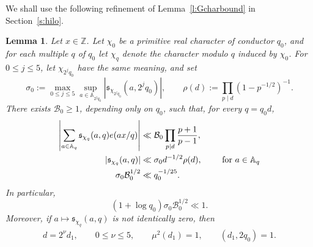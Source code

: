 \documentclass[12pt,reqno]{amsart}
\numberwithin{equation}{section}
\newtheorem{lemma}[equation]{Lemma}
\theoremstyle{definition}
\theoremstyle{remark}
\begin{document}
We shall use the following refinement of Lemma~\ref{l:Gcharbound} in
Section~\ref{s:hilo}.

\begin{lemma}\label{l:exceptionalarithmetic}
Let \(x\in\mathbb Z\). Let $\chi_0$ be a primitive real character of conductor $q_0$, and for
each multiple $q$ of $q_0$ let $\chi_q$ denote the character modulo $q$
induced by $\chi_0$.  For \(0\leq j\leq5\), let
\(\chi_{2^jq_0}\) have the same meaning, and set
\[
 \sigma_0:=
 \max_{0\leq j\leq5}
 \sup_{a\in\mathbb A_{2^jq_0}}
 |\mathfrak s_{\chi_{2^jq_0}}(a,2^jq_0)|,
 \qquad
 \rho(d):=\prod_{p\mid d}(1-p^{-1/2})^{-1}.
\]
There exists $\mathcal B_0\geq1$, depending only on $q_0$, such that,
for every \(q=q_0d\),
\begin{align}\label{e:exceptionalarithmetic}
 \left|
 \sum_{a\in\mathbb A_q}
 \mathfrak s_{\chi_q}(a,q)e(ax/q)
 \right|
 &\ll
 \mathcal B_0\prod_{p\mid d}\frac{p+1}{p-1},\notag\\
 |\mathfrak s_{\chi_q}(a,q)|
 &\ll \sigma_0d^{-1/2}\rho(d),
 \qquad \textup{ for } a\in \mathbb{A}_q\\
  \sigma_0\mathcal B_0^{1/2}&\ll q_0^{-1/25}.
\end{align}
In particular,
\[
 (1+\log q_0)\sigma_0\mathcal B_0^{1/2}\ll1.
\]
Moreover, if
\(a\mapsto\mathfrak s_{\chi_q}(a,q)\) is not identically zero, then
\begin{align}\label{e:sqfreeconds}
    d=2^\nu d_1,\qquad
 0\leq\nu\leq5,\qquad
 \mu^2(d_1)=1,\qquad
 (d_1,2q_0)=1.
\end{align}
\end{lemma}
\end{document}
